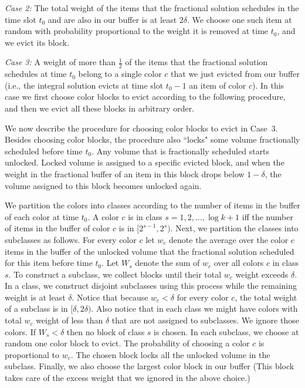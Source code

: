 \documentclass[12pt]{article}
\begin{document}
{\em Case 2:}\/ The total weight of the items that the
fractional solution schedules in the time slot $t_0$ 
and are also in our buffer is at least 
$2\delta$. We choose one such item at random with 
probability proportional to the weight it is removed at
time $t_0$, and we evict its block.

{\em Case 3:}\/ A weight of more than $\frac 1 2$ of
the items that the fractional solution schedules at time
$t_0$ belong to a single color $c$ that we just evicted
from our buffer (i.e., the integral solution evicts at time 
slot $t_0 - 1$ an item of color $c$). 
In this case we first choose color
blocks to evict according to the following procedure, 
and then we evict all these blocks in arbitrary order.

We now describe the procedure for choosing color
blocks to evict in Case~3. Besides choosing color
blocks, the procedure also ``locks" some volume
fractionally scheduled before time $t_0$. Any volume
that is fractionally scheduled starts unlocked. Locked
volume is assigned to a specific evicted block, and
when the weight in the fractional buffer of an item 
in this block drops below $1 - \delta$, the volume
assigned to this block becomes unlocked again.
 
We partition the colors into classes according to the
number of items in the buffer of each color at time $t_0$.
A color $c$ is in class $s=1,2,\dots,\log k + 1$ iff the
number of items in the buffer of color $c$ is in $[2^{s-1},2^s)$.
Next, we partition the classes into subclasses as follows.
For every color $c$ let $w_c$ denote the average over the 
color $c$ items in the buffer of the unlocked volume
that the fractional solution scheduled for this item
before time $t_0$. Let $W_s$ denote the sum of $w_c$
over all colors $c$ in class $s$. To construct a subclass, 
we collect
blocks until their total $w_c$ weight exceeds $\delta$.
In a class, we construct disjoint subclasses using this
process while the remaining weight is at least $\delta$.
Notice that because $w_c < \delta$ for every color $c$,
the total weight of a subclass is in $[\delta,2\delta)$.
Also notice that in each class we might have colors with
total $w_c$ weight of less than $\delta$ that are not
assigned to subclasses. We ignore those colors. If 
$W_s < \delta$ then no block of class $s$ is chosen.
In each subclass, we choose at random one color block 
to evict. The probability of choosing a color $c$ is 
proportional to $w_c$. The chosen block locks all
the unlocked volume in the subclass. Finally, we also 
choose the largest color block in our buffer (This block 
takes care of the excess weight that we ignored in the 
above choice.)
\end{document}
